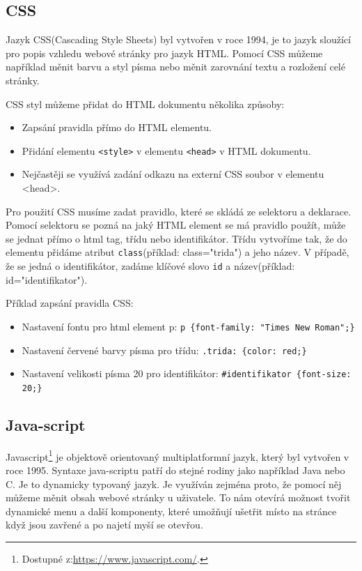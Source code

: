 \subsection{CSS}

Jazyk CSS(Cascading Style Sheets) byl vytvořen v roce 1994, je to jazyk sloužící pro popis vzhledu webové stránky pro jazyk HTML. Pomocí CSS můžeme například měnit barvu a styl písma nebo měnit zarovnání textu a rozložení celé stránky. \cite{css}

CSS styl můžeme přidat do HTML dokumentu několika způsoby: \cite{css}

\begin{itemize}
  \item{Zapsání pravidla přímo do HTML elementu.}
  \item{Přidání elementu \texttt{<style>} v elementu \texttt{<head>} v HTML dokumentu.}
  \item{Nejčastěji se využívá zadání odkazu na externí CSS soubor v elementu <head>.}
\end{itemize}

Pro použití CSS musíme zadat pravidlo, které se skládá ze selektoru a deklarace. Pomocí selektoru se pozná na jaký HTML element se má pravidlo použít, může se jednat přímo o html tag, třídu nebo identifikátor. Třídu vytvoříme tak, že do elementu přidáme atribut \texttt{class}(příklad: class="trida") a jeho název. V případě, že se jedná o identifikátor, zadáme klíčové slovo \texttt{id} a název(příklad: id="identifikator"). \cite{css}

Příklad zapsání pravidla CSS:

\begin{itemize}
  \item{Nastavení fontu pro html element p: \texttt{p \{font-family: "Times New Roman";\}}}
  \item{Nastavení červené barvy písma pro třídu: \texttt{.trida: \{color: red;\}}}
  \item{Nastavení velikosti písma 20 pro identifikátor: \texttt{\#identifikator \{font-size: 20;\}}}
\end{itemize}


\subsection{Java-script}

Javascript\footnote{Dostupné z:\url{https://www.javascript.com/}.} je objektově orientovaný multiplatformní jazyk, který byl vytvořen v roce 1995. Syntaxe java-scriptu patří do stejné rodiny jako například Java nebo C. Je to dynamicky typovaný jazyk. Je využíván zejména proto, že pomocí něj můžeme měnit obsah webové stránky u uživatele. To nám otevírá možnost tvořit dynamické menu a další komponenty, které umožňují ušetřit místo na stránce když jsou zavřené a po najetí myší se otevřou. \cite{javascript1}


